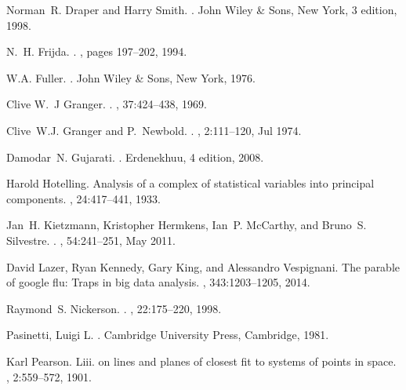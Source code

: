 \documentclass[10pt]{article}
\begin{document}
\begin{thebibliography}{10}
Norman~R. Draper and Harry Smith.
.
\newblock John Wiley \& Sons, New York, 3 edition, 1998.

N.~H. Frijda.
.
, pages 197--202,
  1994.

W.A. Fuller.
.
\newblock John Wiley \& Sons, New York, 1976.

Clive W.~J Granger.
.
, 37:424--438, 1969.

Clive~W.J. Granger and P.~Newbold.
.
, 2:111--120, Jul 1974.

Damodar~N. Gujarati.
.
\newblock Erdenekhuu, 4 edition, 2008.

Harold Hotelling.
\newblock Analysis of a complex of statistical variables into principal
  components.
, 24:417--441, 1933.

Jan~H. Kietzmann, Kristopher Hermkens, Ian~P. McCarthy, and Bruno~S. Silvestre.
.
, 54:241--251, May 2011.

David Lazer, Ryan Kennedy, Gary King, and Alessandro Vespignani.
\newblock The parable of google flu: Traps in big data analysis.
, 343:1203--1205, 2014.

Raymond~S. Nickerson.
.
, 22:175--220, 1998.

{Pasinetti, Luigi L.}
.
\newblock Cambridge University Press, Cambridge, 1981.

Karl Pearson.
\newblock Liii. on lines and planes of closest fit to systems of points in
  space.
, 2:559--572, 1901.


\end{thebibliography}
\end{document}
